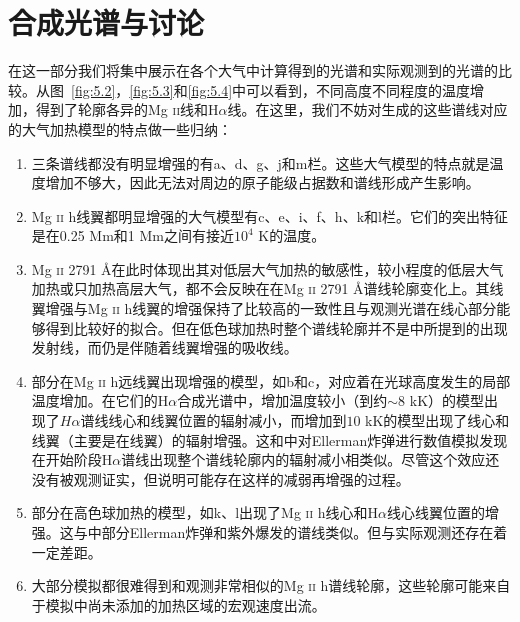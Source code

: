 \section{合成光谱与讨论}在这一部分我们将集中展示在各个大气中计算得到的光谱和实际观测到的光谱的比较。从图~\ref{fig:5.2}，\ref{fig:5.3}和\ref{fig:5.4}中可以看到，不同高度不同程度的温度增加，得到了轮廓各异的Mg \textsc{ii}线和H$\alpha$线。在这里，我们不妨对生成的这些谱线对应的大气加热模型的特点做一些归纳：
\begin{enumerate}
	\item 三条谱线都没有明显增强的有a、d、g、j和m栏。这些大气模型的特点就是温度增加不够大，因此无法对周边的原子能级占据数和谱线形成产生影响。
	\item Mg \textsc{ii} h线翼都明显增强的大气模型有c、e、i、f、h、k和l栏。它们的突出特征是在0.25 Mm和1 Mm之间有接近$10^4$ K的温度。
	\item Mg \textsc{ii} 2791 \mbox{\AA}在此时体现出其对低层大气加热的敏感性，较小程度的低层大气加热或只加热高层大气，都不会反映在在Mg \textsc{ii} 2791 \mbox{\AA}谱线轮廓变化上。其线翼增强与Mg \textsc{ii} h线翼的增强保持了比较高的一致性且与观测光谱在线心部分能够得到比较好的拟合。但在低色球加热时整个谱线轮廓并不是\textcites{Pereira2015}中所提到的出现发射线，而仍是伴随着线翼增强的吸收线。
	\item 部分在Mg \textsc{ii} h远线翼出现增强的模型，如b和c，对应着在光球高度发生的局部温度增加。在它们的H$\alpha$合成光谱中，增加温度较小（到约$\sim 8$ kK）的模型出现了$H\alpha$谱线线心和线翼位置的辐射减小，而增加到$10$ kK的模型出现了线心和线翼（主要是在线翼）的辐射增强。这和\textcites{Hong2017b}中对Ellerman炸弹进行数值模拟发现在开始阶段H$\alpha$谱线出现整个谱线轮廓内的辐射减小相类似。尽管这个效应还没有被观测证实，但说明可能存在这样的减弱再增强的过程。
	\item 部分在高色球加热的模型，如k、l出现了Mg \textsc{ii} h线心和H$\alpha$线心线翼位置的增强。这与\textcites{Hansteen2017}中部分Ellerman炸弹和紫外爆发的谱线类似。但与实际观测还存在着一定差距。
	\item 大部分模拟都很难得到和观测非常相似的Mg \textsc{ii} h谱线轮廓，这些轮廓可能来自于模拟中尚未添加的加热区域的宏观速度出流。

\end{enumerate}




